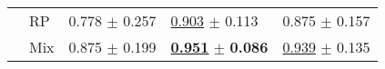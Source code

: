 \begin{tabular}[t]{lllll}
 & RP & \textcolor[rgb]{0.2790211877,0.5000000000,0}{0.778} $\pm$ \textcolor[rgb]{0.9977538235,0.0022461765,0}{0.257} & \underline{\textcolor[rgb]{0.2932263815,0.5000000000,0}{0.903}} $\pm$ \textcolor[rgb]{0.3666523082,0.5000000000,0}{0.113} & \textcolor[rgb]{0.2500000000,0.5000000000,0}{0.875} $\pm$ \textcolor[rgb]{0.1960820797,0.5000000000,0}{0.157} \\
 & Mix & \textcolor[rgb]{0.0492390331,0.5000000000,0}{0.875} $\pm$ \textcolor[rgb]{0.6812870810,0.3187129190,0}{0.199} & \underline{\textbf{\textcolor[rgb]{0.0000000000,0.5000000000,0}{0.951}}} $\pm$ \textbf{\textcolor[rgb]{0.0000000000,0.5000000000,0}{0.086}} & \underline{\textcolor[rgb]{0.0181818182,0.5000000000,0}{0.939}} $\pm$ \textcolor[rgb]{0.0367461744,0.5000000000,0}{0.135} \\
\bottomrule
\end{tabular}

